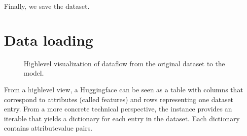 \documentclass[letterpaper,10pt,english]{jupyterBook}
\begin{document}
\sphinxAtStartPar
Finally, we save the dataset.
\begin{sphinxVerbatimInput}

\begin{sphinxVerbatim}[commandchars=\\\{\}]
\end{sphinxVerbatim}
\end{sphinxVerbatimInput}


\section{Data loading}
\label{\detokenize{Prerequisites:data-loading}}
\begin{figure}[htbp]
\centering
\capstart

\noindent{}
\caption{High\sphinxhyphen{}level visualization of data\sphinxhyphen{}flow from the original dataset to the model.}\label{\detokenize{Prerequisites:fig-dataflow}}\end{figure}

\sphinxAtStartPar
From a high\sphinxhyphen{}level view, a Huggingface  can be seen as a table with columns that correspond to attributes (called features) and rows representing one dataset entry.
From a more concrete technical perspective, the \sphinxhyphen{}instance provides an iterable that yields a dictionary for each entry in the dataset. Each dictionary contains attribute\sphinxhyphen{}value pairs.
\begin{sphinxVerbatimInput}

\begin{sphinxVerbatim}[commandchars=\\\{\}]
   

  
\PYG{p}{[}\PYG{p}{]}
\end{sphinxVerbatim}
\end{sphinxVerbatimInput}
\begin{sphinxVerbatimInput}

\begin{sphinxVerbatim}[commandchars=\\\{\}]
\PYG{p}{[}\PYG{p}{]}\PYG{p}{[}\PYG{p}{]}
\end{sphinxVerbatim}
\end{sphinxVerbatimInput}
\end{document}

